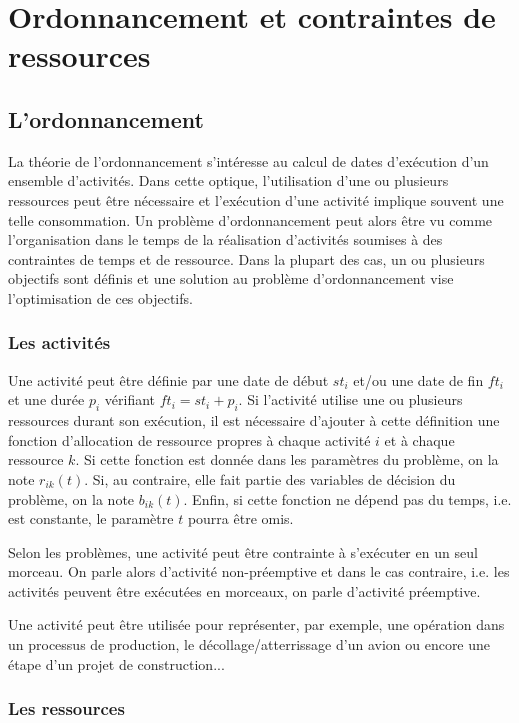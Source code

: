 \section{Ordonnancement et contraintes de ressources}
\subsection{L'ordonnancement}

La théorie de l'ordonnancement s'intéresse au calcul de dates
d'exécution d'un ensemble d'activités. Dans cette optique,
l'utilisation d'une ou plusieurs ressources peut être nécessaire et
l'exécution d'une activité implique souvent une telle consommation. Un
problème d'ordonnancement peut alors être vu comme l'organisation dans
le temps de la réalisation d'activités soumises à des contraintes de
temps et de ressource. Dans la plupart des cas, un ou plusieurs
objectifs sont définis et une solution au problème d'ordonnancement 
vise l'optimisation de ces objectifs.
 
\subsubsection{Les activités}

Une activité peut être définie par une date de début $st_i$ et/ou une date
de fin $ft_i$ et une durée $p_i$ vérifiant $ft_i=st_i+p_i$. Si
l'activité utilise une ou plusieurs ressources durant son exécution, il
est nécessaire d'ajouter à cette définition une fonction d'allocation
de ressource propres à chaque activité $i$ et à chaque
ressource $k$. Si cette fonction est donnée dans les paramètres du
problème, on la note $r_{ik}(t)$. Si, au contraire, elle fait partie
des variables de décision du problème, on la note $b_{ik}(t)$. Enfin,
si cette fonction ne dépend pas du temps, i.e. est constante, le
paramètre $t$ pourra être omis. 

Selon les problèmes, une activité peut être contrainte à s'exécuter en
un seul morceau. On parle alors d'activité non-préemptive et dans le
cas contraire, i.e. les activités peuvent être exécutées en morceaux,
on parle d'activité préemptive. 

Une activité peut être utilisée pour représenter, par exemple, une
opération dans un processus de production, le décollage/atterrissage
d'un avion ou encore une étape d'un projet de construction...

\subsubsection{Les ressources}

